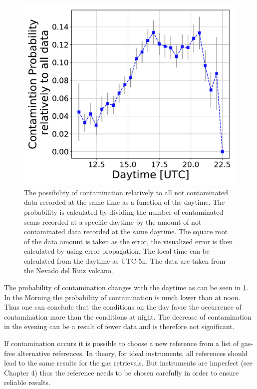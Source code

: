 \begin{figure}
	\centering
	\includegraphics[width=0.5\linewidth]{Bilder/ConProb}
	\caption[The possibility of contamination relatively to all not contaminated data recorded at the same time as a function of the daytime. The data are taken from the Nevado del Ruiz volcano.]{ The possibility of contamination relatively to all not contaminated data recorded at the same time as a function of the daytime. The probability is calculated by dividing the number of contaminated scans recorded at a specific daytime by the amount of not contaminated data recorded at the same daytime. The square root of the data amount is taken as the error, the visualized error is then calculated by using error propagation. The local time can be calculated from the daytime as UTC-5h. The data are taken from the Nevado del Ruiz volcano.}
	\label{fig:conprob}
\end{figure}
The probability of contamination changes with the daytime as can be seen in \cref{fig:conprob}. In the Morning the probability of contamination is much lower than at noon. Thus one can conclude that the conditions on the day favor the occurrence of contamination more than the conditions at night. The decrease of contamination in the evening can be a result of fewer data and is therefore not significant.

If contamination occurs it is possible to choose a new reference from a list of gas-free alternative references. In theory, for ideal instruments, all references should lead to
the same results for the gas retrievals. But instruments are imperfect (see Chapter
4) thus the reference needs to be chosen carefully in order to ensure reliable results.\\
%
\\

